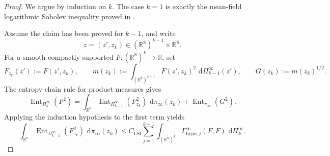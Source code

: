 \documentclass[11pt]{article}
\theoremstyle{remark}
\newcommand{\R}{\mathbb R}
\newcommand{\dd}{\,\mathrm d}
\newcommand{\Ent}{\operatorname{Ent}}
\begin{document}
\begin{proof}
We argue by induction on $k$.  The case $k=1$ is exactly the mean-field
logarithmic Sobolev inequality proved in \cite{convergence}.

Assume the claim has been proved for $k-1$, and write
\[
z=(z',z_k)\in (\R^8)^{k-1}\times\R^8.
\]
For a smooth compactly supported $F:(\R^8)^k\to\R$, set
\[
F_{z_k}(z'):=F(z',z_k),
\qquad
m(z_k):=\int_{(\R^8)^{k-1}} F(z',z_k)^2\,\dd\Pi_{k-1}^\infty(z'),
\qquad
G(z_k):=m(z_k)^{1/2}.
\]
The entropy chain rule for product measures gives
\[
\Ent_{\Pi_k^\infty}(F^2)
=
\int_{\R^8}\Ent_{\Pi_{k-1}^\infty}(F_{z_k}^2)\,\dd\pi_\infty(z_k)
+\Ent_{\pi_\infty}(G^2).
\]
Applying the induction hypothesis to the first term yields
\[
\int_{\R^8}\Ent_{\Pi_{k-1}^\infty}(F_{z_k}^2)\,\dd\pi_\infty(z_k)
\le
C_{\mathrm{LSI}}
\sum_{j=1}^{k-1}
\int_{(\R^8)^k}\Gamma_{\mathrm{hypo},j}^\infty(F,F)\,\dd\Pi_k^\infty.
\]


\end{proof}
\end{document}
